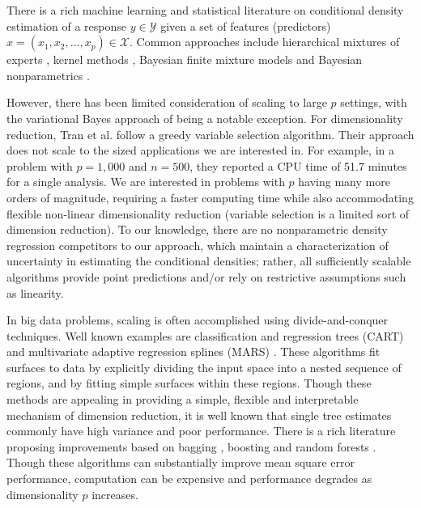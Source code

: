 \documentclass{article} %
\begin{document}
There is a rich machine learning and statistical literature on conditional density estimation of a response $y \in \mathcal{Y}$ given a set of features (predictors) $x=(x_1, x_2, \ldots, x_p)\in \mathcal{X}$. Common approaches include hierarchical mixtures of experts \cite{mixtureexperts,jiang1999}, kernel methods \cite{fan1996,fanyim2004,holmes2010,fu2011}, Bayesian finite mixture models \cite{nott2012,tran2012,norets2012} and Bayesian nonparametrics 
\cite{griffin06, dunson2007, DunsonPark, chung2009, tokdar2010}.  

However, there has been limited consideration of scaling to large $p$ settings, with the variational Bayes approach of \cite{tran2012} being a notable exception. For dimensionality reduction, Tran et al. follow a greedy variable selection algorithm.  Their approach does not scale to the sized applications we are interested in. For example, in a problem with $p=1,000$ and $n=500$, they reported a CPU time of 51.7 minutes for a single analysis.  We are interested in problems with  $p$ having many more orders of magnitude, requiring a faster computing time while also accommodating flexible non-linear dimensionality reduction (variable selection is a limited sort of dimension reduction).  To our knowledge, there are no nonparametric density regression competitors to our approach, which maintain a characterization of uncertainty in estimating the conditional densities; rather, all sufficiently scalable algorithms provide point predictions and/or rely on restrictive assumptions such as linearity.  

In big data problems, scaling is often accomplished using divide-and-conquer techniques. Well known examples are classification and regression trees (CART) \cite{CART} and multivariate adaptive regression splines (MARS) \cite{MARS}. These algorithms fit surfaces to data by explicitly dividing the input space into a nested sequence of regions, and by fitting simple surfaces  within these regions. Though these methods are appealing in providing a simple, flexible and interpretable mechanism of dimension reduction, it is well known that single tree estimates commonly have high variance and poor performance.  There is a rich literature proposing improvements based on bagging \cite{Bagging}, boosting \cite{Boosting} and random forests \cite{RandomForest}. Though these algorithms can substantially improve mean square error performance, computation can be expensive and performance degrades as dimensionality $p$ increases.
\end{document}
